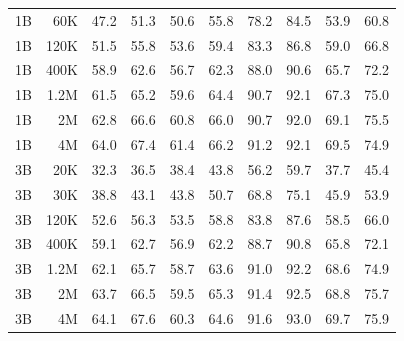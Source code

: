 \begin{table}[t]
\begin{tabulary}{1.0\textwidth}{l r c c c c c c c c}
1B    & 60K   & 47.2 & 51.3 & 50.6 & 55.8 & 78.2 & 84.5 & 53.9 & 60.8 \\
1B    & 120K  & 51.5 & 55.8 & 53.6 & 59.4 & 83.3 & 86.8 & 59.0 & 66.8 \\
1B    & 400K  & 58.9 & 62.6 & 56.7 & 62.3 & 88.0 & 90.6 & 65.7 & 72.2 \\
1B    & 1.2M  & 61.5 & 65.2 & 59.6 & 64.4 & 90.7 & 92.1 & 67.3 & 75.0 \\
1B    & 2M    & 62.8 & 66.6 & 60.8 & 66.0 & 90.7 & 92.0 & 69.1 & 75.5 \\
1B    & 4M    & 64.0 & 67.4 & 61.4 & 66.2 & 91.2 & 92.1 & 69.5 & 74.9 \\
\midrule[0.25pt]
3B    & 20K   & 32.3 & 36.5 & 38.4 & 43.8 & 56.2 & 59.7 & 37.7 & 45.4 \\
3B    & 30K   & 38.8 & 43.1 & 43.8 & 50.7 & 68.8 & 75.1 & 45.9 & 53.9 \\
3B    & 120K  & 52.6 & 56.3 & 53.5 & 58.8 & 83.8 & 87.6 & 58.5 & 66.0 \\
3B    & 400K  & 59.1 & 62.7 & 56.9 & 62.2 & 88.7 & 90.8 & 65.8 & 72.1 \\
3B    & 1.2M  & 62.1 & 65.7 & 58.7 & 63.6 & 91.0 & 92.2 & 68.6 & 74.9 \\
3B    & 2M    & 63.7 & 66.5 & 59.5 & 65.3 & 91.4 & 92.5 & 68.8 & 75.7 \\
3B    & 4M    & 64.1 & 67.6 & 60.3 & 64.6 & 91.6 & 93.0 & 69.7 & 75.9 \\
    \bottomrule
  \end{tabulary}
\end{table}


